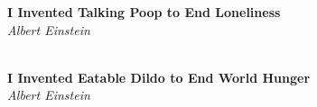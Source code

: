 \noindent\textbf{I Invented Talking Poop to End Loneliness}\\
\noindent\textit{Albert Einstein}\\
\\
\smallskip

\noindent\textbf{I Invented Eatable Dildo to End World Hunger}\\
\noindent\textit{Albert Einstein}\\
\\
\\
\smallskip